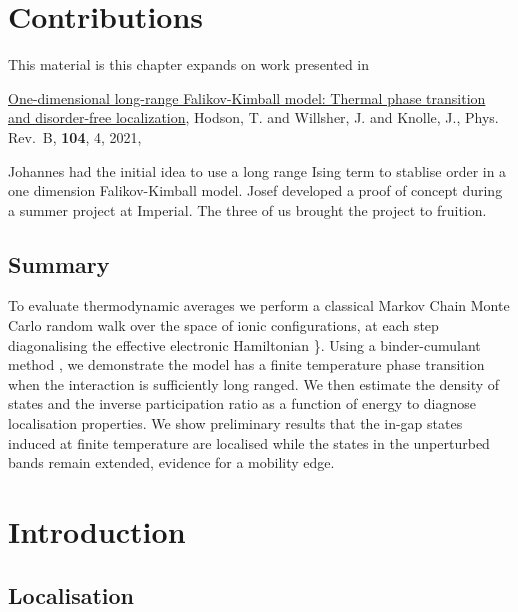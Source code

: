 \hypertarget{contributions}{%
\section{Contributions}\label{contributions}}

This material is this chapter expands on work presented in

\autocite{hodsonOnedimensionalLongRangeFalikovKimball2021} \href{https://link.aps.org/doi/10.1103/PhysRevB.104.045116}{One-dimensional long-range Falikov-Kimball model: Thermal phase transition and disorder-free localization}, Hodson, T. and Willsher, J. and Knolle, J., Phys. Rev.~B, \textbf{104}, 4, 2021,

Johannes had the initial idea to use a long range Ising term to stablise order in a one dimension Falikov-Kimball model. Josef developed a proof of concept during a summer project at Imperial. The three of us brought the project to fruition.

\hypertarget{summary}{%
\subsection{Summary}\label{summary}}

To evaluate thermodynamic averages we perform a classical Markov Chain Monte Carlo random walk over the space of ionic configurations, at each step diagonalising the effective electronic Hamiltonian \textcite{maskaThermodynamicsTwodimensionalFalicovKimball2006}\}. Using a binder-cumulant method \autocite{binderFiniteSizeScaling1981,musialMonteCarloSimulations2002}, we demonstrate the model has a finite temperature phase transition when the interaction is sufficiently long ranged. We then estimate the density of states and the inverse participation ratio as a function of energy to diagnose localisation properties. We show preliminary results that the in-gap states induced at finite temperature are localised while the states in the unperturbed bands remain extended, evidence for a mobility edge.

\hypertarget{introduction}{%
\section{Introduction}\label{introduction}}

\hypertarget{localisation}{%
\subsection{Localisation}\label{localisation}}


